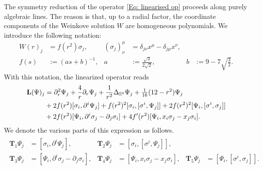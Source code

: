 \documentclass[11pt,reqno]{amsart}
\theoremstyle{remark}
\newcommand{\Lf}{\textup{\textbf{L}}}
\theoremstyle{definition}
\begin{document}
The symmetry reduction of the operator \eqref{Eq: linearised op} proceeds along purely algebraic lines. The reason is that, up to a radial factor, the coordinate components of the Weinkove solution $W$ are homogeneous polynomials. We introduce the following notation:
\begin{align*}
    W(r)_j &= f(r^2) \sigma_j, & (\sigma_{j})^\mu_\nu &= \delta_{j\nu} x^\mu - \delta_{j \mu} x^\nu, & \\ f(s) &:= (a s + b)^{-1}, &
    a &:= \frac{\sqrt{3}}{2\sqrt{2}}, & b &:= 9 - 7 \sqrt{\tfrac{3}{2}}.
\end{align*}
With this notation, the linearized operator reads
\begin{align}
    \label{Eq: linearised op reduced}
    \begin{split}
\Lf (\Psi)_j &= \partial_r^2 \Psi_j + \frac{4}{r} \partial_r \Psi_j + \frac1{r^2}\Delta_{\mathbb S^4} \Psi_j + \tfrac1{16}(12 - r^2) \Psi_j \\ &+2 f(r^2) [\sigma_i, \partial^i \Psi_j]+ f(r^2)^2 [\sigma_i,[\sigma^i,\Psi_j]] + 2f(r^2)^2[\Psi_i,[\sigma^i,\sigma_j]] \\ &+ 2 f(r^2) [\Psi_i, \partial^i \sigma_j - \partial_j \sigma_i] + 4 f'(r^2) [\Psi_i, x_i \sigma_j - x_j \sigma_i].
    \end{split}
\end{align}
We denote the various parts of this expression as follows.
\begin{align}
\label{eq:T_operators}
\begin{aligned}
    \mathbf T_1 \Psi_j &= [\sigma_i, \partial^i \Psi_j], &
    \mathbf T_2 \Psi_j &= [\sigma_i,[\sigma^i,\Psi_j]], \\
    \mathbf T_3 \Psi_j &= [\Psi_i, \partial^i \sigma_j - \partial_j \sigma_i], &
    \mathbf T_4 \Psi_j &= [\Psi_i, x_i \sigma_j - x_j \sigma_i], &
    \mathbf T_5 \Psi_j &= [\Psi_i,[\sigma^i,\sigma_j]].
\end{aligned}
\end{align}
\end{document}
